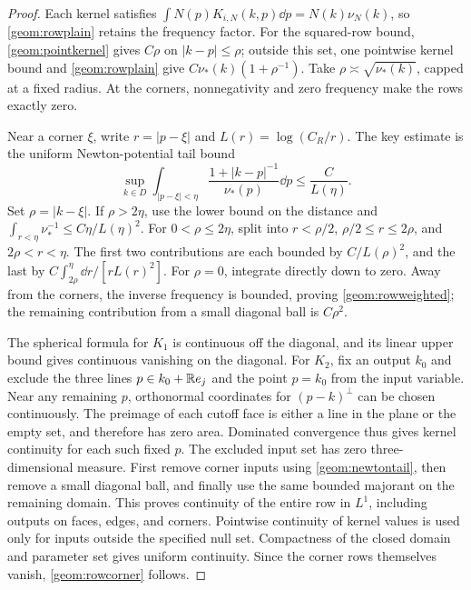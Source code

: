 \begin{proof}
Each kernel satisfies $\int N(p)K_{i,N}(k,p)\dd p=N(k)\nu_N(k)$,
so \eqref{geom:rowplain} retains the frequency factor.
For the squared-row bound, \eqref{geom:pointkernel} gives $C\rho$
on $|k-p|\le\rho$; outside this set, one pointwise kernel bound
and \eqref{geom:rowplain} give $C\nu_*(k)(1+\rho^{-1})$.
Take $\rho\asymp\sqrt{\nu_*(k)}$, capped at a fixed radius.
At the corners, nonnegativity and zero frequency make the rows exactly zero.

Near a corner $\xi$, write $r=|p-\xi|$ and $L(r)=\log(C_R/r)$.
The key estimate is the uniform Newton-potential tail bound
\begin{equation}\label{geom:newtontail}
 \sup_{k\in D}\int_{|p-\xi|<\eta}
 \frac{1+|k-p|^{-1}}{\nu_*(p)}\dd p\le\frac C{L(\eta)}.
\end{equation}
Set $\rho=|k-\xi|$. If $\rho>2\eta$, use the lower bound on the distance
and $\int_{r<\eta}\nu_*^{-1}\le C\eta/L(\eta)^2$.
For $0<\rho\le2\eta$, split into $r<\rho/2$,
$\rho/2\le r\le2\rho$, and $2\rho<r<\eta$. The first two contributions
are each bounded by $C/L(\rho)^2$, and the last by
$C\int_{2\rho}^{\eta}\dd r/[rL(r)^2]$.
For $\rho=0$, integrate directly down to zero.
Away from the corners, the inverse frequency is bounded, proving
\eqref{geom:rowweighted}; the remaining contribution from a small diagonal
ball is $C\rho^2$.

The spherical formula for $K_1$ is continuous off the diagonal, and its
linear upper bound gives continuous vanishing on the diagonal.
For $K_2$, fix an output $k_0$ and exclude the three lines
$p\in k_0+\mathbb R e_j$ and the point $p=k_0$ from the input variable.
Near any remaining $p$, orthonormal coordinates for $(p-k)^\perp$
can be chosen continuously. The preimage of each cutoff face is either
a line in the plane or the empty set, and therefore has zero area.
Dominated convergence thus gives kernel continuity for each such fixed $p$.
The excluded input set has zero three-dimensional measure.
First remove corner inputs using \eqref{geom:newtontail}, then remove a
small diagonal ball, and finally use the same bounded majorant on the
remaining domain. This proves continuity of the entire row in $L^1$,
including outputs on faces, edges, and corners.
Pointwise continuity of kernel values is used only for inputs outside
the specified null set. Compactness of the closed domain and parameter
set gives uniform continuity. Since the corner rows themselves vanish,
\eqref{geom:rowcorner} follows.
\end{proof}

